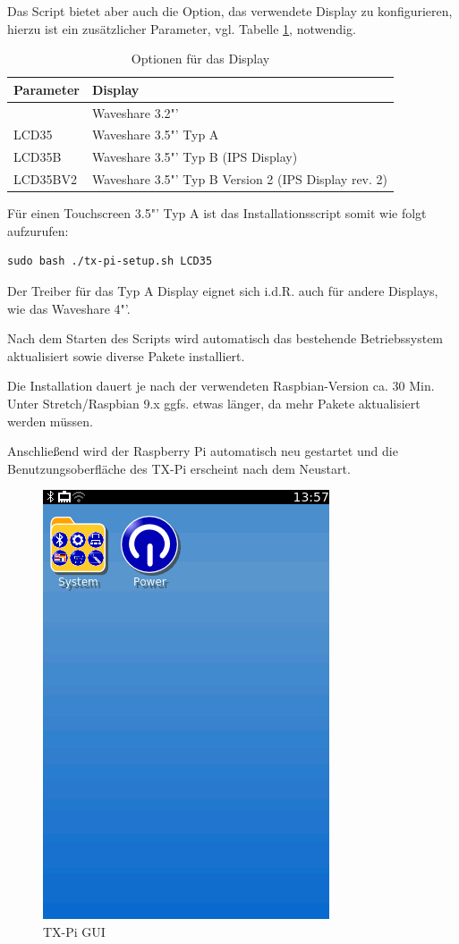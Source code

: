 \documentclass[
  paper=A4,
  ngerman,
  fontsize=12pt,
  parskip=half-,
]{scrbook}
\begin{document}
Das Script bietet aber auch die Option, das verwendete Display zu 
konfigurieren, hierzu ist ein zusätzlicher Parameter, vgl. Tabelle \ref{tab:display_opt},
notwendig.

\begin{table}[ht]
\begin{tabular}{ll}
Parameter & Display \\
\midrule
          & Waveshare 3.2"' \\
LCD35     & Waveshare 3.5"' Typ A \\
LCD35B    & Waveshare 3.5"' Typ B (IPS Display)\\
LCD35BV2  & Waveshare 3.5"' Typ B Version 2 (IPS Display rev. 2)\\
\end{tabular}
\caption{Optionen für das Display}
\label{tab:display_opt}
\end{table}

Für einen Touchscreen 3.5"' Typ A ist das Installationsscript somit wie folgt aufzurufen:
\begin{lstlisting}
sudo bash ./tx-pi-setup.sh LCD35
\end{lstlisting}

Der Treiber für das Typ A Display eignet sich i.d.R. auch für andere
Displays, wie das Waveshare 4"'.


Nach dem Starten des Scripts wird automatisch das bestehende Betriebssystem aktualisiert
sowie diverse Pakete installiert. 

Die Installation dauert je nach der verwendeten Raspbian-Version ca. 30 Min. Unter Stretch/Raspbian 9.x
ggfs. etwas länger, da mehr Pakete aktualisiert werden müssen.

Anschließend wird der Raspberry Pi automatisch neu gestartet und die Benutzungsoberfläche des TX-Pi erscheint nach dem Neustart.

\begin{figure}[h]
\centering
\includegraphics[scale=0.5]{images/gui-start.png}
\caption{TX-Pi GUI}
\end{figure}
\end{document}
